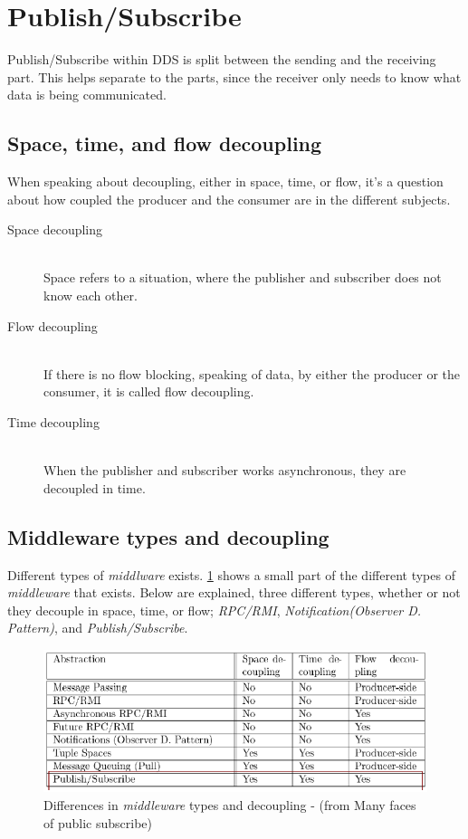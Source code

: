 \section{Publish/Subscribe}
Publish/Subscribe within DDS is split between the sending and the receiving part. This helps separate to the parts, since the receiver only needs to know what data is being communicated.

\subsection{Space, time, and flow decoupling}
When speaking about decoupling, either in space, time, or flow, it's a question about how coupled the producer and the consumer are in the different subjects.

\begin{description}
 \item[Space decoupling] \hfill \\
 Space refers to a situation, where the publisher and subscriber does not know each other.
 \item[Flow decoupling] \hfill \\
 If there is no flow blocking, speaking of data, by either the producer or the consumer, it is called flow decoupling.
 \item[Time decoupling] \hfill \\
 When the publisher and subscriber works asynchronous, they are decoupled in time.
\end{description}

\subsection{Middleware types and decoupling}
Different types of \emph{middlware} exists. \ref{DeInPa} shows a small part of the different types of \emph{middleware} that exists.
Below are explained, three different types, whether or not they decouple in space, time, or flow; \emph{RPC/RMI}, \emph{Notification(Observer D. Pattern)}, and \emph{Publish/Subscribe}.

\begin{figure}[ht!]
\centering
\includegraphics[width=150mm]{img/DecouplingInteractionParadigms.png}
\caption{Differences in \emph{middleware} types and decoupling - (from Many faces of public subscribe)}
\label{DeInPa}
\end{figure}

